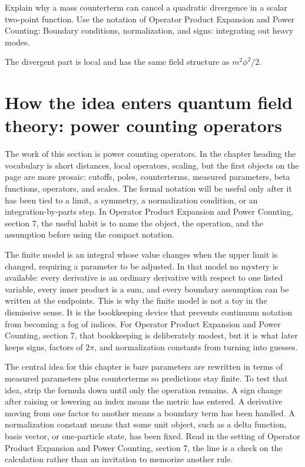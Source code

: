 \begin{exercise}
Explain why a mass counterterm can cancel a quadratic divergence in a scalar two-point function.  Use the notation of Operator Product Expansion and Power Counting: Boundary conditions, normalization, and signs: integrating out heavy modes.
\begin{answer}
The divergent part is local and has the same field structure as \(m^2\phi^2/2\).
\end{answer}
\end{exercise}



\section{How the idea enters quantum field theory: power counting operators}

The work of this section is power counting operators.  In the chapter heading the vocabulary is short distances, local operators, scaling, but the first objects on the page are more prosaic: cutoffs, poles, counterterms, measured parameters, beta functions, operators, and scales.  The formal notation will be useful only after it has been tied to a limit, a symmetry, a normalization condition, or an integration-by-parts step.  In Operator Product Expansion and Power Counting, section 7, the useful habit is to name the object, the operation, and the assumption before using the compact notation.

The finite model is an integral whose value changes when the upper limit is changed, requiring a parameter to be adjusted.  In that model no mystery is available: every derivative is an ordinary derivative with respect to one listed variable, every inner product is a sum, and every boundary assumption can be written at the endpoints.  This is why the finite model is not a toy in the dismissive sense.  It is the bookkeeping device that prevents continuum notation from becoming a fog of indices.  For Operator Product Expansion and Power Counting, section 7, that bookkeeping is deliberately modest, but it is what later keeps signs, factors of \(2\pi\), and normalization constants from turning into guesses.

The central idea for this chapter is bare parameters are rewritten in terms of measured parameters plus counterterms so predictions stay finite.  To test that idea, strip the formula down until only the operation remains.  A sign change after raising or lowering an index means the metric has entered.  A derivative moving from one factor to another means a boundary term has been handled.  A normalization constant means that some unit object, such as a delta function, basis vector, or one-particle state, has been fixed.  Read in the setting of Operator Product Expansion and Power Counting, section 7, the line is a check on the calculation rather than an invitation to memorize another rule.

